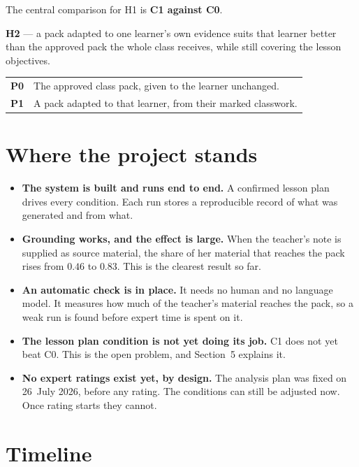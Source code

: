 \documentclass[11pt,a4paper]{article}
\begin{document}
\noindent The central comparison for H1 is \textbf{C1 against C0}.

\medskip
\textbf{H2} — a pack adapted to one learner's own evidence suits that learner better than
the approved pack the whole class receives, while still covering the lesson objectives.

\begin{center}
\begin{tabular}{@{}ll@{}}
\toprule
\textbf{P0} & The approved class pack, given to the learner unchanged.\\
\textbf{P1} & A pack adapted to that learner, from their marked classwork.\\
\bottomrule
\end{tabular}
\end{center}

\section{Where the project stands}

\begin{itemize}
\item \textbf{The system is built and runs end to end.} A confirmed lesson plan drives every
condition. Each run stores a reproducible record of what was generated and from what.

\item \textbf{Grounding works, and the effect is large.} When the teacher's note is supplied
as source material, the share of her material that reaches the pack rises from
$0.46$ to $0.83$. This is the clearest result so far.

\item \textbf{An automatic check is in place.} It needs no human and no language model. It
measures how much of the teacher's material reaches the pack, so a weak run is found before
expert time is spent on it.

\item \textbf{The lesson plan condition is not yet doing its job.} C1 does not yet beat C0.
This is the open problem, and Section~5 explains it.

\item \textbf{No expert ratings exist yet, by design.} The analysis plan was fixed on
26~July 2026, before any rating. The conditions can still be adjusted now. Once rating
starts they cannot.
\end{itemize}

\section{Timeline}
\end{document}

